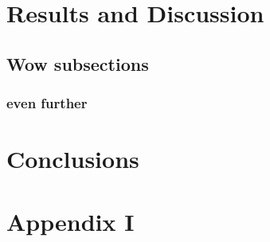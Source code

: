 \documentclass[a4paper,11pt]{MeLabtexMemo}
\begin{document}
\section{Results and Discussion}

\subsection{Wow subsections}
\subsubsection{even further}


\section{Conclusions}
\appendix
\section{Appendix I}
 
\printbibliography %
\end{document}
